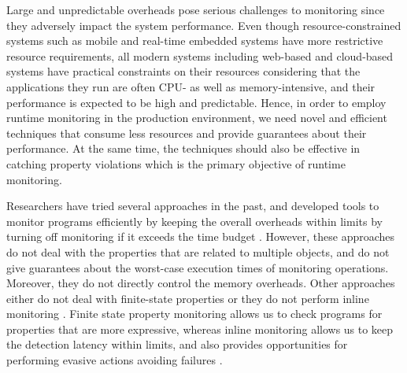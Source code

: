 Large and unpredictable overheads pose serious challenges to 
monitoring since they adversely impact the system performance.
Even though resource-constrained systems such as mobile and real-time embedded systems have
more restrictive resource requirements, all modern systems including %
web-based and cloud-based
systems have practical constraints on their resources considering that the applications 
they run are often CPU- as well as memory-intensive, and their performance is 
expected to be high and predictable. Hence, in order to employ runtime 
monitoring in the production environment, we need novel and efficient techniques 
that consume less resources and provide guarantees about their performance.
At the same time, the techniques should also be effective in catching property violations which is the 
primary objective of runtime monitoring.

Researchers have tried several approaches in the past, and developed tools to 
monitor programs efficiently by keeping the overall overheads within limits by 
turning off monitoring if it exceeds the time budget \cite{}. However, these 
approaches do not deal with the properties that are related to multiple 
objects, and do not give guarantees about the worst-case execution times of 
monitoring operations. Moreover, they do not directly control the memory 
overheads. Other approaches either do not deal with finite-state properties or 
they do not perform inline monitoring \cite{}. Finite state property monitoring 
allows us to check programs for properties that are more expressive, whereas 
inline monitoring allows us to keep the detection latency within limits, and 
also provides opportunities for performing evasive actions avoiding failures \cite{}.


